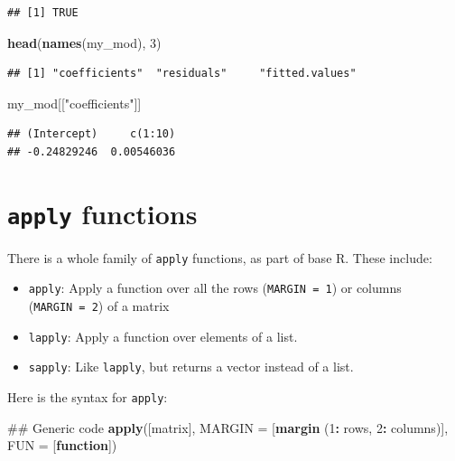\documentclass[]{book}
\makeatletter
\newenvironment{Shaded}{\begin{snugshade}}{\end{snugshade}}
\newcommand{\KeywordTok}[1]{\textcolor[rgb]{0.13,0.29,0.53}{\textbf{#1}}}
\newcommand{\DataTypeTok}[1]{\textcolor[rgb]{0.13,0.29,0.53}{#1}}
\newcommand{\DecValTok}[1]{\textcolor[rgb]{0.00,0.00,0.81}{#1}}
\newcommand{\StringTok}[1]{\textcolor[rgb]{0.31,0.60,0.02}{#1}}
\newcommand{\ControlFlowTok}[1]{\textcolor[rgb]{0.13,0.29,0.53}{\textbf{#1}}}
\newcommand{\OperatorTok}[1]{\textcolor[rgb]{0.81,0.36,0.00}{\textbf{#1}}}
\newcommand{\NormalTok}[1]{#1}
\providecommand{\tightlist}{%
  \setlength{\itemsep}{0pt}\setlength{\parskip}{0pt}}
\newenvironment{kframe}{%
\medskip{}
\setlength{\fboxsep}{.8em}
 \def\at@end@of@kframe{}%
 \ifinner\ifhmode%
  \def\at@end@of@kframe{\end{minipage}}%
  \begin{minipage}{\columnwidth}%
 \fi\fi%
 \def\FrameCommand##1{\hskip\@totalleftmargin \hskip-\fboxsep
 \colorbox{shadecolor}{##1}\hskip-\fboxsep
     \hskip-\linewidth \hskip-\@totalleftmargin \hskip\columnwidth}%
 \MakeFramed {\advance\hsize-\width
   \@totalleftmargin\z@ \linewidth\hsize
   \@setminipage}}%
 {\par\unskip\endMakeFramed%
 \at@end@of@kframe}
\renewenvironment{Shaded}{\begin{kframe}}{\end{kframe}}
\theoremstyle{definition}
\theoremstyle{definition}
\theoremstyle{definition}
\theoremstyle{remark}
\makeatother
\begin{document}
\begin{verbatim}
## [1] TRUE
\end{verbatim}

\begin{Shaded}
\begin{Highlighting}[]
\KeywordTok{head}\NormalTok{(}\KeywordTok{names}\NormalTok{(my_mod), }\DecValTok{3}\NormalTok{)}
\end{Highlighting}
\end{Shaded}

\begin{verbatim}
## [1] "coefficients"  "residuals"     "fitted.values"
\end{verbatim}

\begin{Shaded}
\begin{Highlighting}[]
\NormalTok{my_mod[[}\StringTok{"coefficients"}\NormalTok{]]}
\end{Highlighting}
\end{Shaded}

\begin{verbatim}
## (Intercept)     c(1:10) 
## -0.24829246  0.00546036
\end{verbatim}

\section{\texorpdfstring{\texttt{apply}
functions}{apply functions}}\label{apply-functions}

There is a whole family of \texttt{apply} functions, as part of base R.
These include:

\begin{itemize}
\tightlist
\item
  \texttt{apply}: Apply a function over all the rows
  (\texttt{MARGIN\ =\ 1}) or columns (\texttt{MARGIN\ =\ 2}) of a matrix
\item
  \texttt{lapply}: Apply a function over elements of a list.
\item
  \texttt{sapply}: Like \texttt{lapply}, but returns a vector instead of
  a list.
\end{itemize}

Here is the syntax for \texttt{apply}:

\begin{Shaded}
\begin{Highlighting}[]
\NormalTok{## Generic code}
\KeywordTok{apply}\NormalTok{([matrix], }\DataTypeTok{MARGIN =}\NormalTok{ [}\KeywordTok{margin}\NormalTok{ (}\DecValTok{1}\OperatorTok{:}\StringTok{ }\NormalTok{rows, }\DecValTok{2}\OperatorTok{:}\StringTok{ }\NormalTok{columns)],}
      \DataTypeTok{FUN =}\NormalTok{  [}\ControlFlowTok{function}\NormalTok{])}
\end{Highlighting}
\end{Shaded}
\end{document}
